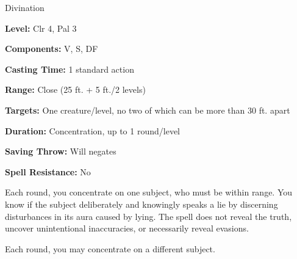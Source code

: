 
Divination

\textbf{Level:} Clr 4, Pal 3

\textbf{Components:} V, S, DF

\textbf{Casting Time:} 1 standard action

\textbf{Range:} Close (25 ft. + 5 ft./2 levels)

\textbf{Targets:} One creature/level, no two of which can be more than 30 ft. apart

\textbf{Duration:} Concentration, up to 1 round/level

\textbf{Saving Throw:} Will negates

\textbf{Spell Resistance:} No

Each round, you concentrate on one subject, who must be within range. You know 
if the subject deliberately and knowingly speaks a lie by discerning disturbances 
in its aura caused by lying. The spell does not reveal the truth, uncover unintentional 
inaccuracies, or necessarily reveal evasions.

Each round, you may concentrate on a different subject.

